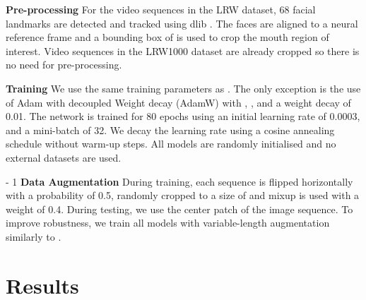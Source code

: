 \documentclass{article}
\begin{document}
\noindent\textbf{Pre-processing}\quad
For the video sequences in the LRW dataset, 68 facial landmarks are detected and tracked using dlib \cite{king2009dlib}. The faces are aligned to a neural reference frame and a bounding box of  is used to crop the mouth region of interest. Video sequences in the LRW1000 dataset are already cropped so there is no need for pre-processing.

\noindent\textbf{Training}\quad
We use the same training parameters as \cite{martinez2020lipreading}. The only exception is the use of Adam with decoupled Weight decay (AdamW) \cite{loshchilov2019decoupled} with , ,  and a weight decay of 0.01. The network is trained for 80 epochs using an initial learning rate of 0.0003, and a mini-batch of 32. We decay the learning rate using a cosine annealing schedule without warm-up steps. All models are randomly initialised and no external datasets are used.

\looseness - 1
\noindent\textbf{Data Augmentation}\quad
During training, each sequence is flipped horizontally with a probability of 0.5, randomly cropped to a size of  and mixup \cite{zhang2017mixup} is used with a weight of 0.4. During testing, we use the  center patch of the image sequence. 
To improve robustness, we train all models with variable-length augmentation similarly to \cite{martinez2020lipreading}.


\section{Results}
\label{sec:results}
\end{document}
